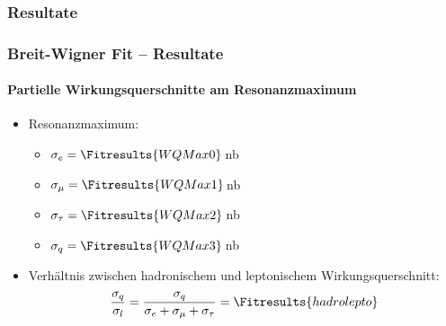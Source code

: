 \documentclass{beamer}
\begin{document}
\subsubsection{Resultate}
\begin{frame}
	\frametitle{Breit-Wigner Fit -- Resultate}
	\framesubtitle{Partielle Wirkungsquerschnitte am Resonanzmaximum}
	\begin{itemize}
		\item Resonanzmaximum:
			\begin{itemize}
				\item[]$\sigma_e = \Fitresults{WQMax0}$\,nb
				\item[]$\sigma_\mu = \Fitresults{WQMax1}$\,nb
				\item[]$\sigma_\tau = \Fitresults{WQMax2}$\,nb
				\item[]$\sigma_q = \Fitresults{WQMax3}$\,nb
			\end{itemize}
		\item Verhältnis zwischen hadronischem und leptonischem Wirkungsquerschnitt:
			\begin{align*}
				\frac{\sigma_q}{\sigma_l} = \frac{\sigma_q}{\sigma_e + \sigma_{\mu} + \sigma_{\tau}} = \Fitresults{hadrolepto}
			\end{align*}
	\end{itemize}


\end{frame}
\end{document}
